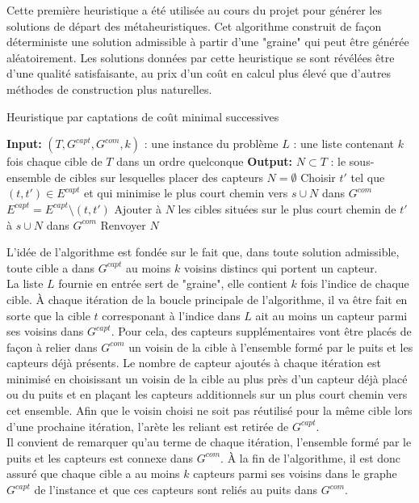 \documentclass[12pt]{article}
\begin{document}
Cette première heuristique a été utilisée au cours du projet pour générer les solutions de départ des métaheuristiques.
Cet algorithme construit de façon déterministe une solution admissible à partir d'une "graine" qui peut être générée aléatoirement.
Les solutions données par cette heuristique se sont révélées être d'une qualité satisfaisante, au prix d'un coût en calcul plus élevé que d'autres méthodes de construction plus naturelles.

\begin{algorithm}[H]
  \caption{Heuristique par captations de coût minimal successives}
  \label{Heuristique par captations de coût minimal successives}
  \begin{algorithmic}
      \STATE \textbf{Input:}
      \STATE $(T, G^{capt}, G^{com}, k)$ : une instance du problème
      \STATE $L$ : une liste contenant $k$ fois chaque cible de $T$ dans un ordre quelconque
      \STATE
      \STATE \textbf{Output:} $N \subset T$ : le sous-ensemble de cibles sur lesquelles placer des capteurs
      \STATE
      \STATE $N = \emptyset$
          \STATE Choisir $t'$ tel que $(t, t') \in E^{capt}$ et qui minimise le plus court chemin vers $s \cup N$ dans $G^{com}$
          \STATE $E^{capt} = E^{capt} \setminus (t, t')$
          \STATE Ajouter à $N$ les cibles situées sur le plus court chemin de $t'$ à $s \cup N$ dans $G^{com}$
      \ENDFOR
      \STATE Renvoyer $N$
  \end{algorithmic}
\end{algorithm}

\bigskip

L'idée de l'algorithme est fondée sur le fait que, dans toute solution admissible, toute cible a dans $G^{capt}$ au moins $k$ voisins distincs qui portent un capteur.\\
La liste $L$ fournie en entrée sert de "graine", elle contient $k$ fois l'indice de chaque cible.
À chaque itération de la boucle principale de l'algorithme, il va être fait en sorte que la cible $t$ corresponant à l'indice dans $L$ ait au moins un capteur parmi ses voisins dans $G^{capt}$.
Pour cela, des capteurs supplémentaires vont être placés de façon à relier dans $G^{com}$ un voisin de la cible à l'ensemble formé par le puits et les capteurs déjà présents.
Le nombre de capteur ajoutés à chaque itération est minimisé en choisissant un voisin de la cible au plus près d'un capteur déjà placé ou du puits et en plaçant les capteurs additionnels sur un plus court chemin vers cet ensemble.
Afin que le voisin choisi ne soit pas réutilisé pour la même cible lors d'une prochaine itération, l'arète les reliant est retirée de $G^{capt}$.\\
Il convient de remarquer qu'au terme de chaque itération, l'ensemble formé par le puits et les capteurs est connexe dans $G^{com}$.
À la fin de l'algorithme, il est donc assuré que chaque cible a au moins $k$ capteurs parmi ses voisins dans le graphe $G^{capt}$ de l'instance et que ces capteurs sont reliés au puits dans $G^{com}$.
\end{document}
